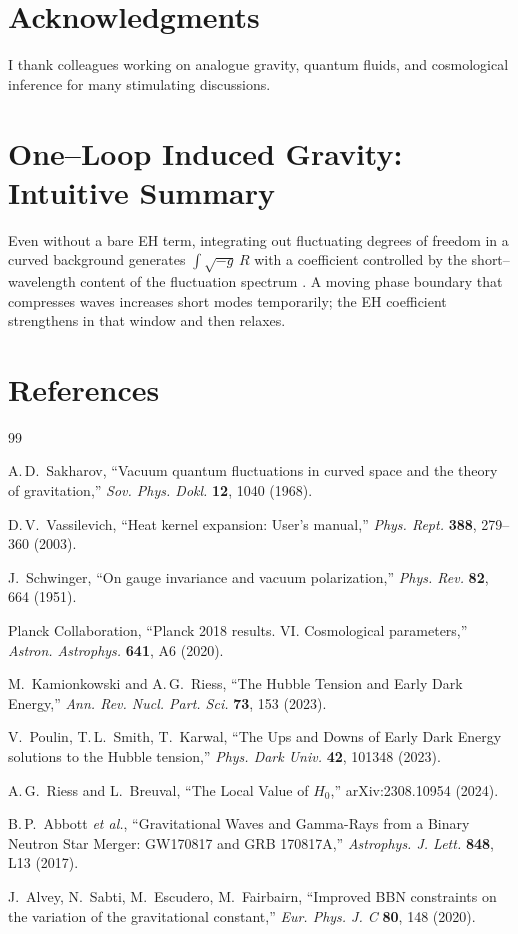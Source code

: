 \documentclass[11pt,a4paper]{article}
\begin{document}
\section*{Acknowledgments}
I thank colleagues working on analogue gravity, quantum fluids, and cosmological inference for many stimulating discussions.

\appendix
\section{One--Loop Induced Gravity: Intuitive Summary}
Even without a bare EH term, integrating out fluctuating degrees of freedom in a curved background generates $\int \sqrt{-g}\,R$ with a coefficient controlled by the short--wavelength content of the fluctuation spectrum \cite{Sakharov1967,Vassilevich2003}. A moving phase boundary that compresses waves increases short modes temporarily; the EH coefficient strengthens in that window and then relaxes.

\section*{References}
\begin{thebibliography}{99}

A.\,D.~Sakharov, ``Vacuum quantum fluctuations in curved space and the theory of gravitation,'' \emph{Sov. Phys. Dokl.} \textbf{12}, 1040 (1968).

D.\,V.~Vassilevich, ``Heat kernel expansion: User's manual,'' \emph{Phys. Rept.} \textbf{388}, 279--360 (2003).

J.~Schwinger, ``On gauge invariance and vacuum polarization,'' \emph{Phys. Rev.} \textbf{82}, 664 (1951).

Planck Collaboration, ``Planck 2018 results. VI. Cosmological parameters,'' \emph{Astron. Astrophys.} \textbf{641}, A6 (2020).

M.~Kamionkowski and A.\,G.~Riess, ``The Hubble Tension and Early Dark Energy,'' \emph{Ann. Rev. Nucl. Part. Sci.} \textbf{73}, 153 (2023).

V.~Poulin, T.\,L.~Smith, T.~Karwal, ``The Ups and Downs of Early Dark Energy solutions to the Hubble tension,'' \emph{Phys. Dark Univ.} \textbf{42}, 101348 (2023).

A.\,G.~Riess and L.~Breuval, ``The Local Value of $H_0$,'' arXiv:2308.10954 (2024).

B.\,P.~Abbott \emph{et al.}, ``Gravitational Waves and Gamma-Rays from a Binary Neutron Star Merger: GW170817 and GRB 170817A,'' \emph{Astrophys. J. Lett.} \textbf{848}, L13 (2017).

J.~Alvey, N.~Sabti, M.~Escudero, M.~Fairbairn, ``Improved BBN constraints on the variation of the gravitational constant,'' \emph{Eur. Phys. J. C} \textbf{80}, 148 (2020).

\end{thebibliography}
\end{document}
